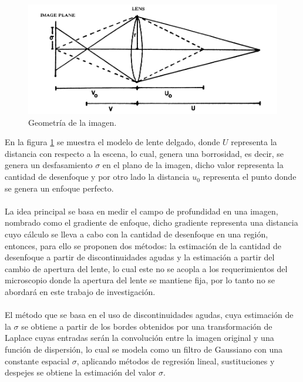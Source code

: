 \begin{figure}[ht]
\centering
\includegraphics[scale=0.50]{GraficosEdArt/profcamp.PNG} 
\caption{Geometría de la imagen.\citet{Pentland}}
\label{fig1}
\end{figure}
En la figura \ref{fig1} se muestra el modelo de lente delgado, donde $U$ representa la distancia con respecto a la escena, lo cual,  genera una borrosidad, es decir, se genera un desfasamiento $\sigma$ en el plano de la imagen, dicho valor representa la cantidad de desenfoque y por otro lado la distancia $u_{0}$ representa el punto donde se genera un enfoque perfecto.
\\
\\
La idea principal se basa en medir el campo de profundidad en una imagen, nombrado como el gradiente de enfoque, dicho gradiente representa una distancia cuyo cálculo se lleva a cabo con la cantidad de desenfoque en una región, entonces, para ello se proponen dos métodos: la estimación de la cantidad de desenfoque a partir de discontinuidades agudas y la estimación a partir del cambio de apertura del lente, lo cual este no se acopla a los requerimientos del microscopio donde la apertura del lente se mantiene fija, por lo tanto no se abordará en este trabajo de investigación.
\\
\\
El método que se basa en el uso de discontinuidades agudas, cuya estimación de la $\sigma$ se obtiene a partir de los bordes obtenidos por una transformación de Laplace cuyas entradas serán la convolución entre la imagen original y una función de dispersión, lo cual se modela como un filtro de Gaussiano con una constante espacial $\sigma$, aplicando métodos de regresión lineal, sustituciones y despejes se obtiene la estimación del valor $\sigma$. 
